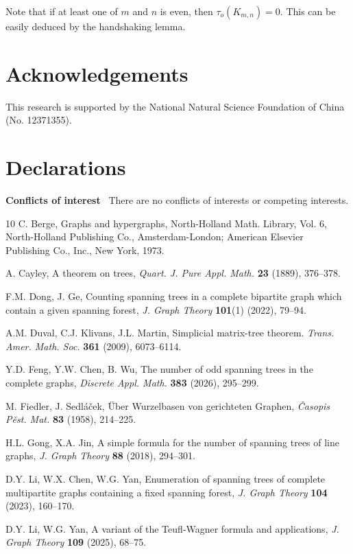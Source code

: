 \documentclass[10pt,a4paper]{article}
\newtheorem{false statement}{False statement}
\theoremstyle{definition}
\begin{document}
Note that if at least one of $m$ and $n$ is even, then $\tau_o(K_{m,n})=0$. This can be easily deduced by the handshaking lemma.

\section*{Acknowledgements}
This research is supported by the National Natural Science Foundation of China (No. 12371355).

\section*{Declarations}
{\bf Conflicts of interest} ~There are no conflicts of interests or competing interests.


\begin{thebibliography}{10}
C. Berge,
Graphs and hypergraphs,
North-Holland Math. Library, Vol. 6,
North-Holland Publishing Co., Amsterdam-London; American Elsevier Publishing Co., Inc., New York, 1973.

A. Cayley,
A theorem on trees,
\emph{Quart. J. Pure Appl. Math.} {\bf 23} (1889), 376--378.

F.M. Dong, J. Ge,
Counting spanning trees in a complete bipartite graph which contain a given spanning forest,
\emph{J. Graph Theory} {\bf 101}(1) (2022), 79--94.

A.M. Duval, C.J. Klivans, J.L. Martin,
Simplicial matrix-tree theorem.
\emph{Trans. Amer. Math. Soc.} {\bf 361} (2009),
6073--6114.

Y.D. Feng, Y.W. Chen, B. Wu, 
The number of odd spanning trees in the complete graphs, 
\emph{Discrete Appl. Math.} {\bf 383} (2026), 295--299.

M. Fiedler, J. Sedl\'a\v{c}ek, 
\"{U}ber Wurzelbasen von gerichteten Graphen, 
\emph{\v{C}asopis P\v{e}st. Mat.} {\bf 83} (1958), 214--225.

H.L. Gong, X.A. Jin,
A simple formula for the number of spanning trees of line graphs,
\emph{J. Graph Theory} {\bf 88} (2018), 294--301.

D.Y. Li, W.X. Chen, W.G. Yan, 
Enumeration of spanning trees of complete multipartite graphs containing a fixed spanning forest,
\emph{J. Graph Theory} {\bf 104} (2023), 160--170.

D.Y. Li, W.G. Yan, 
A variant of the Teufl‐Wagner formula and applications,
\emph{J. Graph Theory} {\bf 109} (2025), 68--75.


\end{thebibliography}
\end{document}
